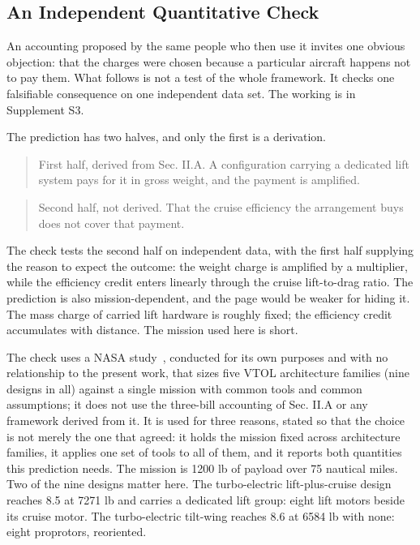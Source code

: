 \documentclass[journal]{new-aiaa}
\begin{document}
\subsection{An Independent Quantitative Check}

An accounting proposed by the same people who then use it invites one obvious objection: that the charges were chosen because a particular aircraft happens not to pay them. What follows is not a test of the whole framework. It checks one falsifiable consequence on one independent data set. The working is in Supplement S3.

The prediction has two halves, and only the first is a derivation.

\begin{quote}
First half, derived from Sec. II.A. A configuration carrying a dedicated lift system pays for it in gross weight, and the payment is amplified.
\end{quote}

\begin{quote}
Second half, not derived. That the cruise efficiency the arrangement buys does not cover that payment.
\end{quote}

The check tests the second half on independent data, with the first half supplying the reason to expect the outcome: the weight charge is amplified by a multiplier, while the efficiency credit enters linearly through the cruise lift-to-drag ratio. The prediction is also mission-dependent, and the page would be weaker for hiding it. The mass charge of carried lift hardware is roughly fixed; the efficiency credit accumulates with distance. The mission used here is short.

The check uses a NASA study~\cite{r16}, conducted for its own purposes and with no relationship to the present work, that sizes five VTOL architecture families (nine designs in all) against a single mission with common tools and common assumptions; it does not use the three-bill accounting of Sec. II.A or any framework derived from it. It is used for three reasons, stated so that the choice is not merely the one that agreed: it holds the mission fixed across architecture families, it applies one set of tools to all of them, and it reports both quantities this prediction needs. The mission is 1200 lb of payload over 75 nautical miles. Two of the nine designs matter here. The turbo-electric lift-plus-cruise design reaches 8.5 at 7271 lb and carries a dedicated lift group: eight lift motors beside its cruise motor. The turbo-electric tilt-wing reaches 8.6 at 6584 lb with none: eight proprotors, reoriented.
\end{document}
